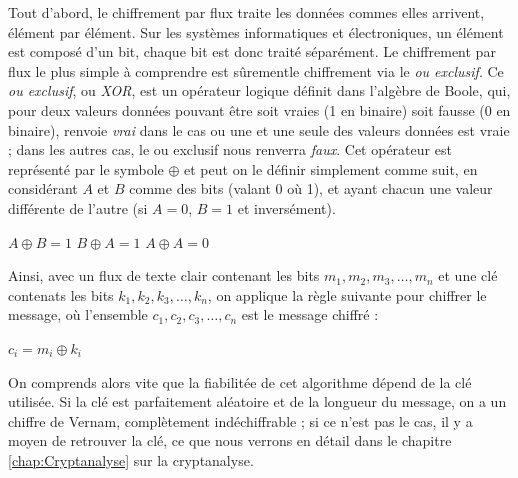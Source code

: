 \label{syst:XOR}
Tout d'abord, le chiffrement par flux traite les données commes elles
arrivent, élément par élément. Sur les systèmes informatiques et
électroniques, un élément est composé d'un bit, chaque bit est donc
traité séparément. Le chiffrement par flux le plus simple à comprendre
est sûrementle chiffrement via le \emph{ou exclusif}. Ce \emph{ou
  exclusif}, ou \emph{XOR}, est un opérateur logique définit dans
l'algèbre de Boole, qui, pour deux valeurs données pouvant être soit
vraies (1 en binaire) soit fausse (0 en binaire), renvoie \emph{vrai}
dans le cas ou une et une seule des valeurs données est vraie ; dans
les autres cas, le ou exclusif nous renverra \emph{faux}. Cet
opérateur est représenté par le symbole $\oplus$ et peut on le définir
simplement comme suit, en considérant $A$ et $B$ comme des bits (valant 0
où 1), et ayant chacun une valeur différente de l'autre (si $A=0$,
$B=1$ et inversément).
\begin{center}
  $A \oplus B = 1$ \hspace{1.5cm} $B \oplus A = 1$ \hspace{1.5cm} $A
\oplus A = 0$ 
\end{center} 

Ainsi, avec un flux de texte clair contenant les bits $m_1,
m_2, m_3, \dots, m_n$ et une clé contenats les bits $k_1, k_2, k_3,
\dots, k_n$, on applique la règle suivante pour chiffrer le message,
où l'ensemble $c_1, c_2, c_3, \dots, c_n$ est le message chiffré :
\begin{center}
$c_i = m_i \oplus k_i$
\end{center}

On comprends alors vite que la fiabilitée de cet algorithme dépend de
la clé utilisée. Si la clé est parfaitement aléatoire et de la
longueur du message, on a un chiffre de Vernam, complètement
indéchiffrable ; si ce n'est pas le cas, il y a moyen de retrouver la
clé, ce que nous verrons en détail dans le chapitre
\ref{chap:Cryptanalyse} sur la cryptanalyse.



